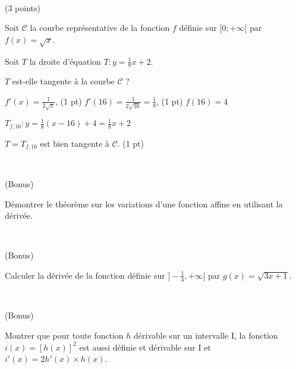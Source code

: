 \documentclass[a4paper,11pt]{article}
\theoremstyle{break}
\begin{document}
 ~
  \vspace{1cm}
  
  \begin{exo}(3 points)
   ~
      \vspace{0.25cm}
   
   Soit $\mathcal{C}$ la courbe représentative de la fonction
   $f$ définie sur $[0;+\infty[$ par $f(x)=\sqrt{x}$.
   
   Soit $T$ la droite d'équation $T:y=\frac{1}{8}x+ 2$.
   
   $T$ est-elle tangente à la courbe $\mathcal{C}$ ?
\begin{correction}

    $f'(x)=\frac{1}{2\sqrt{x}}$, (1 pt)
    $f'(16)=\frac{1}{2\sqrt{16}}=\frac{1}{8}$, (1 pt)
    $f(16)=4$   
    
    $T_{f,16}:y=\frac{1}{8}(x-16)+4=\frac{1}{8}x+2$
    
    $T=T_{f,16}$ est bien tangente \`a $\mathcal{C}$. (1 pt)
\end{correction}
  \end{exo}
    
     ~
  \vspace{0.5cm}

\begin{exo}(Bonus)
    ~
  \vspace{0.5cm}
  
  Démontrer le théorème sur les variations d'une fonction affine en utilisant la dérivée.
\end{exo}

    ~
  \vspace{0.5cm}
  
\begin{exo}(Bonus)
    ~
  \vspace{0.5cm}
  
 Calculer la dérivée de la fonction définie sur $]-\frac{1}{3},+\infty[$ par $g(x)=\sqrt{3x+1}$.
\end{exo}
  
      ~
  \vspace{0.5cm}
  
\begin{exo}(Bonus)
    ~
  \vspace{0.5cm}
  
    Montrer que pour toute fonction $h$ dérivable sur un intervalle I, la fonction $i(x)=[h(x)]^2$
  est aussi définie et dérivable sur I et $i'(x)=2 h'(x) \times h(x)$.
 
\end{exo}

    
\end{document}
